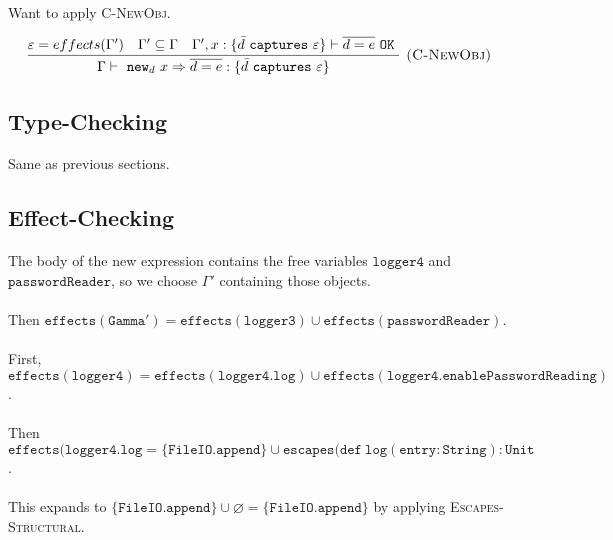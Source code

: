 \documentclass{llncs}
\newcommand{\keywadj}[1]{\mathtt{#1}}
\newcommand{\keyw}[1]{\keywadj{#1}~}
\begin{document}
\paragraph{}
Want to apply \textsc{C-NewObj}.

\[
\begin{array}{c}
\infer[\textsc{(C-NewObj)}]
	{\Gamma \vdash~\keywadj{new}_d~x \Rightarrow \overline{d = e} : \{  \bar d~\keyw{captures} \varepsilon \} }
	{\varepsilon = effects(\Gamma') & \Gamma' \subseteq \Gamma & \Gamma', x : \{ \bar d~\keyw {captures} \varepsilon \} \vdash \overline{d = e}~\keyw{OK}} \\
\end{array}
\]

\subsection*{Type-Checking}

Same as previous sections.

\subsection*{Effect-Checking}

\paragraph{}
The body of the new expression contains the free variables $\keywadj{logger4}$ and $\keywadj{passwordReader}$, so we choose $\Gamma'$ containing those objects.

\paragraph{}
Then $\keywadj{effects(Gamma') = effects(logger3) \cup effects(passwordReader)}$.

\paragraph{}
First, $\keywadj{effects(logger4) = effects(logger4.log) \cup effects(logger4.enablePasswordReading)}$.

\paragraph{}
Then $\keywadj{effects(logger4.log = \{ FileIO.append \} \cup escapes(def~log(entry : String) : Unit}$.

\paragraph{}
This expands to $\keywadj{ \{ FileIO.append \} \cup \varnothing = \{ FileIO.append \}}$ by applying \textsc{Escapes-Structural}.
\end{document}
